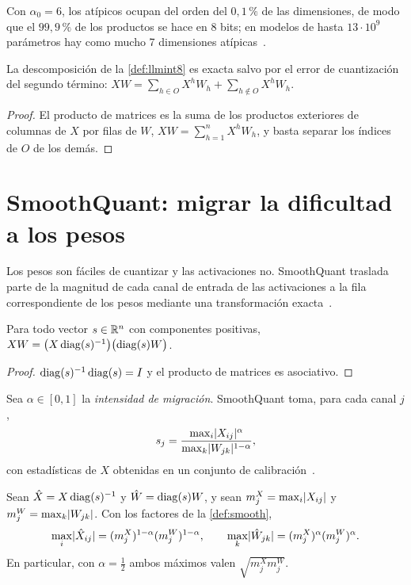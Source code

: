 Con $\alpha_0=6$, los atípicos ocupan del orden del $0{,}1\,\%$ de las dimensiones, de modo que el $99{,}9\,\%$ de los productos se hace en 8 bits; en modelos de hasta $13\cdot 10^{9}$ parámetros hay como mucho 7 dimensiones atípicas~\cite[§3.2]{llmint8}.

\begin{proposicion}\label{prop:descomp}
La descomposición de la \cref{def:llmint8} es exacta salvo por el error de cuantización del segundo término: $XW=\sum_{h\in O}X^{h}W_{h}+\sum_{h\notin O}X^{h}W_{h}$.
\end{proposicion}

\begin{proof}
El producto de matrices es la suma de los productos exteriores de columnas de $X$ por filas de $W$, $XW=\sum_{h=1}^{n}X^{h}W_{h}$, y basta separar los índices de $O$ de los demás.
\end{proof}

\section{SmoothQuant: migrar la dificultad a los pesos}

Los pesos son fáciles de cuantizar y las activaciones no. SmoothQuant traslada parte de la magnitud de cada canal de entrada de las activaciones a la fila correspondiente de los pesos mediante una transformación exacta~\cite[§4]{smoothquant}.

\begin{proposicion}\label{prop:smooth}
Para todo vector $s\in\mathbb{R}^{n}$ con componentes positivas, $XW=\bigl(X\operatorname{diag}(s)^{-1}\bigr)\bigl(\operatorname{diag}(s)W\bigr)$.
\end{proposicion}

\begin{proof}
$\operatorname{diag}(s)^{-1}\operatorname{diag}(s)=I$ y el producto de matrices es asociativo.
\end{proof}

\begin{definicion}\label{def:smooth}
Sea $\alpha\in[0,1]$ la \emph{intensidad de migración}. SmoothQuant toma, para cada canal $j$,
\[
s_j=\frac{\max_i\lvert X_{ij}\rvert^{\alpha}}{\max_k\lvert W_{jk}\rvert^{1-\alpha}},
\]
con estadísticas de $X$ obtenidas en un conjunto de calibración~\cite[ec.~4]{smoothquant}.
\end{definicion}

\begin{proposicion}[Equilibrio con $\alpha=\tfrac12$]\label{prop:alfa-medio}
Sean $\hat X=X\operatorname{diag}(s)^{-1}$ y $\hat W=\operatorname{diag}(s)W$, y sean $m^{X}_{j}=\max_i\lvert X_{ij}\rvert$ y $m^{W}_{j}=\max_k\lvert W_{jk}\rvert$. Con los factores de la \cref{def:smooth},
\[
\max_i\lvert\hat X_{ij}\rvert=(m^{X}_{j})^{1-\alpha}(m^{W}_{j})^{1-\alpha},\qquad
\max_k\lvert\hat W_{jk}\rvert=(m^{X}_{j})^{\alpha}(m^{W}_{j})^{\alpha}.
\]
En particular, con $\alpha=\tfrac12$ ambos máximos valen $\sqrt{m^{X}_{j}m^{W}_{j}}$.
\end{proposicion}

